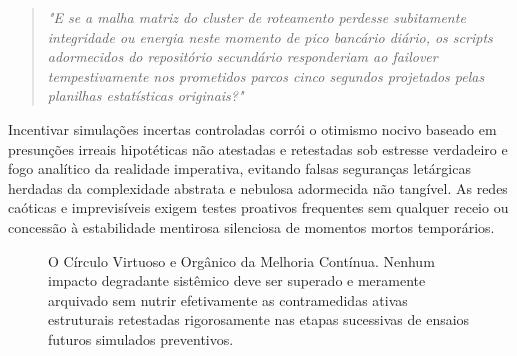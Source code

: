 \documentclass[12pt,a4paper,twoside]{report}
\begin{document}
\begin{quote}
    \textit{"E se a malha matriz do cluster de roteamento perdesse subitamente integridade ou energia neste momento de pico bancário diário, os scripts adormecidos do repositório secundário responderiam ao \textit{failover} tempestivamente nos prometidos parcos cinco segundos projetados pelas planilhas estatísticas originais?"}
\end{quote}

Incentivar simulações incertas controladas corrói o otimismo nocivo baseado em presunções irreais hipotéticas não atestadas e retestadas sob estresse verdadeiro e fogo analítico da realidade imperativa, evitando falsas seguranças letárgicas herdadas da complexidade abstrata e nebulosa adormecida não tangível. As redes caóticas e imprevisíveis exigem testes proativos frequentes sem qualquer receio ou concessão à estabilidade mentirosa silenciosa de momentos mortos temporários.

\begin{figure}[h]
    \centering
    \caption{O Círculo Virtuoso e Orgânico da Melhoria Contínua. Nenhum impacto degradante sistêmico deve ser superado e meramente arquivado sem nutrir efetivamente as contramedidas ativas estruturais retestadas rigorosamente nas etapas sucessivas de ensaios futuros simulados preventivos.}
\end{figure}
\end{document}

